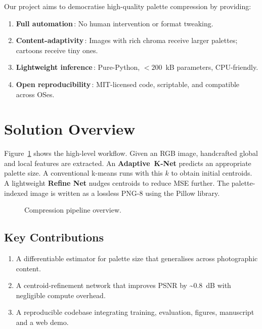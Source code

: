 \documentclass[11pt]{article}
\begin{document}
Our project aims to democratise high-quality palette compression by providing:
\begin{enumerate}
  \item \textbf{Full automation}\,: No human intervention or format tweaking.
  \item \textbf{Content-adaptivity}\,: Images with rich chroma receive larger palettes; cartoons receive tiny ones.
  \item \textbf{Lightweight inference}\,: Pure-Python, $<
200$~kB parameters, CPU-friendly.
  \item \textbf{Open reproducibility}\,: MIT-licensed code, scriptable, and compatible across OSes.
\end{enumerate}

\section{Solution Overview}
Figure~\ref{fig:pipeline} shows the high-level workflow. Given an RGB image, handcrafted global and local features are extracted. An \textbf{Adaptive~K-Net} predicts an appropriate palette size. A conventional k-means runs with this $k$ to obtain initial centroids. A lightweight \textbf{Refine Net} nudges centroids to reduce MSE further. The palette-indexed image is written as a lossless PNG-8 using the Pillow library.

\begin{figure}[H]
  \centering
  \caption{Compression pipeline overview.}
  \label{fig:pipeline}
\end{figure}

\subsection{Key Contributions}
\begin{enumerate}
  \item A differentiable estimator for palette size that generalises across photographic content.
  \item A centroid-refinement network that improves PSNR by \textasciitilde0.8~dB with negligible compute overhead.
  \item A reproducible codebase integrating training, evaluation, figures, manuscript and a web demo.
\end{enumerate}
\end{document}
